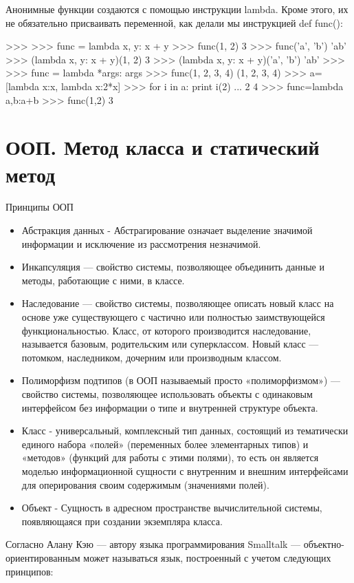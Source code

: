 Анонимные функции создаются с помощью инструкции lambda. Кроме этого, их не обязательно присваивать переменной, как делали мы инструкцией def func():
\begin{python}
>>>
>>> func = lambda x, y: x + y
>>> func(1, 2)
3
>>> func('a', 'b')
'ab'
>>> (lambda x, y: x + y)(1, 2)
3
>>> (lambda x, y: x + y)('a', 'b')
'ab'
>>>
>>> func = lambda *args: args
>>> func(1, 2, 3, 4)
(1, 2, 3, 4)
>>> a=[lambda x:x, lambda x:2*x]
>>> for i in a: print i(2)
... 
2
4
>>> func=lambda a,b:a+b
>>> func(1,2)
3	
\end{python}

\section{ООП. Метод класса и статический метод}

Принципы ООП

\begin{itemize}
\item Абстракция данных - Абстрагирование означает выделение значимой информации и исключение из рассмотрения незначимой. 
\item Инкапсуляция — свойство системы, позволяющее объединить данные и методы, работающие с ними, в классе.
\item Наследование — свойство системы, позволяющее описать новый класс на основе уже существующего с частично или полностью заимствующейся функциональностью. Класс, от которого производится наследование, называется базовым, родительским или суперклассом. Новый класс — потомком, наследником, дочерним или производным классом.
\item Полиморфизм подтипов (в ООП называемый просто «полиморфизмом») — свойство системы, позволяющее использовать объекты с одинаковым интерфейсом без информации о типе и внутренней структуре объекта.
\item Класс - универсальный, комплексный тип данных, состоящий из тематически единого набора «полей» (переменных более элементарных типов) и «методов» (функций для работы с этими полями), то есть он является моделью информационной сущности с внутренним и внешним интерфейсами для оперирования своим содержимым (значениями полей). 
\item Объект - Сущность в адресном пространстве вычислительной системы, появляющаяся при создании экземпляра класса.
\end{itemize}

Согласно Алану Кэю — автору языка программирования Smalltalk — объектно-ориентированным может называться язык, построенный с учетом следующих принципов:

